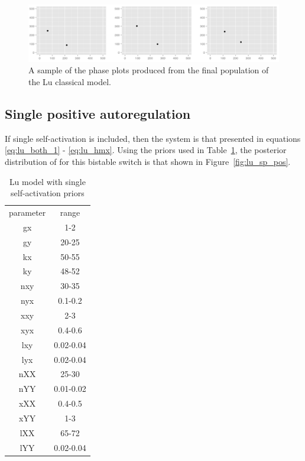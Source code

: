 \begin{figure}[htbp]
\centering
\includegraphics[scale=0.2]{chapterModelling/Lu_switches/images/classic/phase_plot.png}
\caption{A sample of the phase plots produced from the final population of the Lu classical model.}
\label{fig:lu_phase}
\end{figure}
\clearpage

\subsection{Single positive autoregulation}

If single self-activation is included, then the system is that presented in equations \ref{eq:lu_both_1} - \ref{eq:lu_hmx}. Using the priors used in Table~\ref{tab:lu_sp_pr}, the posterior distribution of for this bistable switch is that shown in Figure~\ref{fig:lu_sp_pos}. 

\begin{table}[htbp]
\centering
\caption{Lu model with single self-activation priors}
\label{tab:lu_sp_pr}
\begin{tabular}{cc}
parameter & range \\
gx & 1-2 \\
gy & 20-25 \\
kx & 50-55 \\
ky & 48-52 \\
nxy & 30-35 \\
nyx & 0.1-0.2 \\
xxy & 2-3 \\
xyx & 0.4-0.6 \\
lxy & 0.02-0.04 \\
lyx & 0.02-0.04 \\
nXX & 25-30  \\
nYY & 0.01-0.02 \\
xXX & 0.4-0.5 \\
xYY & 1-3 \\
lXX & 65-72 \\
lYY & 0.02-0.04
\end{tabular}
\end{table}


